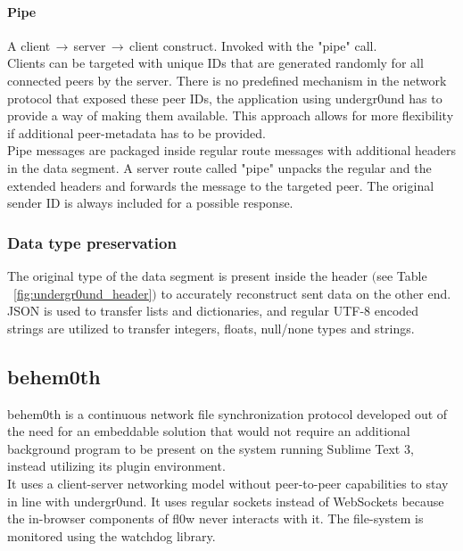 \documentclass[conference,a4paper]{IEEEtran}
\begin{document}
\paragraph{Pipe}
A client$\,\to\,$server$\,\to\,$client construct. Invoked with the {\color{deepgreen}"pipe"} call. \\Clients can be targeted with unique IDs that are generated randomly for all connected peers by the server. There is no predefined mechanism in the network protocol that exposed these peer IDs, the application using undergr0und has to provide a way of making them available. This approach allows for more flexibility if additional peer-metadata has to be provided. \\Pipe messages are packaged inside regular route messages with additional headers in the data segment. A server route called {\color{deepgreen}"pipe"} unpacks the regular and the extended headers and forwards the message to the targeted peer. The original sender ID is always included for a possible response.\\

\subsubsection{Data type preservation}
The original type of the data segment is present inside the header $($see Table ~\ref{fig:undergr0und_header}$)$ to accurately reconstruct sent data on the other end. JSON\cite{JSON:T. Bray Ed.} is used to transfer lists and dictionaries, and regular UTF-8 encoded strings are utilized to transfer integers, floats, null/none types and strings. 

\subsection{behem0th}
behem0th\cite{behem0th:Christoph Heiss} is a continuous network file synchronization protocol developed out of the need for an embeddable solution that would not require an additional background program to be present on the system running Sublime Text 3, instead utilizing its plugin environment. \\It uses a client-server networking model without peer-to-peer capabilities to stay in line with undergr0und. It uses regular sockets instead of WebSockets because the in-browser components of fl0w never interacts with it. The file-system is monitored using the watchdog\cite{watchdog:Yesudeep Mangalapilly} library.\\
\end{document}
